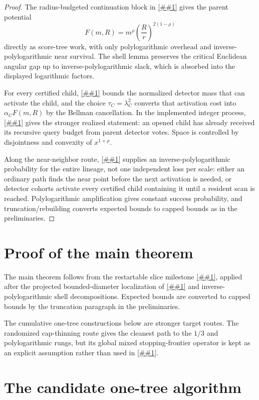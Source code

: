 \documentclass[10pt]{article}
\newcommand{\cref}[1]{\ref{##1}}
\theoremstyle{definition}
\begin{document}
\begin{proof}
   The radius-budgeted continuation block in \cref{cor:radius-budgeted-block} gives the parent potential
   \[
      F(m,R)=m^\rho\left(\frac Rr\right)^{2(1-\rho)}
   \]
   directly as score-tree work, with only polylogarithmic overhead and inverse-polylogarithmic near survival. The shell lemma preserves the critical Euclidean angular gap up to inverse-polylogarithmic slack, which is absorbed into the displayed logarithmic factors.

   For every certified child, \cref{lem:first-hit} bounds the normalized detector mass that can activate the child, and the choice $\tau_C=\lambda_C^2$ converts that activation cost into $\alpha_C F(m,R)$ by the Bellman cancellation. In the implemented integer process, \cref{lem:vote-budget} gives the stronger realized statement: an opened child has already received its recursive query budget from parent detector votes. Space is controlled by disjointness and convexity of $x^{1+\rho}$.

   Along the near-neighbor route, \cref{asm:cohort-or-leaf} supplies an inverse-polylogarithmic probability for the entire lineage, not one independent loss per scale: either an ordinary path finds the near point before the next activation is needed, or detector cohorts activate every certified child containing it until a resident scan is reached. Polylogarithmic amplification gives constant success probability, and truncation/rebuilding converts expected bounds to capped bounds as in the preliminaries.
\end{proof}

\section{Proof of the main theorem}

The main theorem follows from the restartable slice milestone \cref{prop:slice-two-thirds}, applied after the projected bounded-diameter localization of \cref{lem:localization} and inverse-polylogarithmic shell decompositions. Expected bounds are converted to capped bounds by the truncation paragraph in the preliminaries.

The cumulative one-tree constructions below are stronger target routes. The randomized cap-thinning route gives the cleanest path to the $1/3$ and polylogarithmic rungs, but its global mixed stopping-frontier operator is kept as an explicit assumption rather than used in \cref{thm:main}.

\section{The candidate one-tree algorithm}
\end{document}
